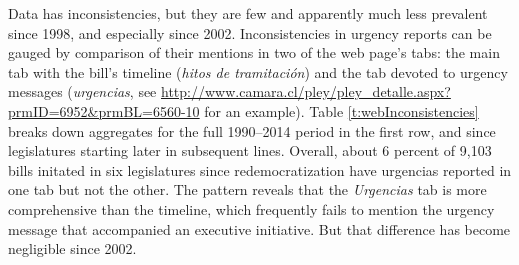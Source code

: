 \documentclass[letter,12pt]{article}
\begin{document}
Data has inconsistencies, but they are few and apparently much less prevalent since 1998, and especially since 2002. Inconsistencies in urgency reports can be gauged by comparison of their mentions in two of the web page's tabs: the main tab with the bill's timeline (\emph{hitos de tramitación}) and the tab devoted to urgency messages (\emph{urgencias}, see \url{http://www.camara.cl/pley/pley_detalle.aspx?prmID=6952&prmBL=6560-10} for an example). Table \ref{t:webInconsistencies} breaks down aggregates for the full 1990--2014 period in the first row, and since legislatures starting later in subsequent lines. Overall, about 6 percent of 9,103 bills initated in six legislatures since redemocratization have urgencias reported in one tab but not the other. The pattern reveals that the \emph{Urgencias} tab is more comprehensive than the timeline, which frequently fails to mention the urgency message that accompanied an executive initiative. But that difference has become negligible since 2002. 
\end{document}
